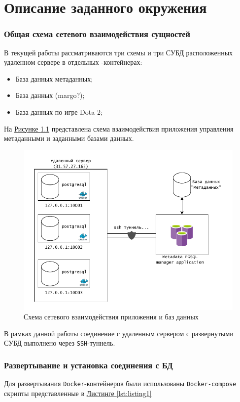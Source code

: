 \chapter{Описание заданного окружения}
\subsection{Общая схема сетевого взаимодействия сущностей}
В текущей работы рассматриваются три схемы и три СУБД расположенных удаленном сервере в отдельных -контейнерах:
\begin{itemize}
	\item База данных метаданных;
	\item База данных (margo?);
	\item База данных по игре Dota 2;
\end{itemize}

На \hyperref[fig:general-schema]{Рисунке \ref*{fig:general-schema}} представлена схема взаимодействия приложения управления метаданными и заданными базами данных.
\begin{figure}[h!]
	\centering
	\includegraphics[width=1\linewidth]{docker-general-schema.drawio.pdf}
	\caption{Схема сетевого взаимодействия приложения и баз данных}
	\label{fig:general-schema}
\end{figure}

В рамках данной работы соединение с удаленным сервером с развернутыми СУБД выполнено через \texttt{SSH}-туннель.

\subsection{Развертывание и установка соединения с БД}
Для развертывания \texttt{Docker}-контейнеров были использованы \texttt{Docker-compose} скрипты представленные в \hyperref[lst:listing1]{Листинге \ref*{lst:listing1}}

